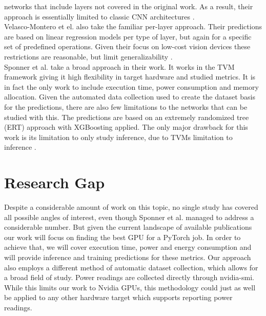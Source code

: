 networks that include layers not covered in the original work. As a result, their approach is essentially
limited to classic CNN architectures \cite{gianniti_performance_nodate}. \\
Velasco-Montero et el. also take the familiar per-layer approach. Their predictions are based on linear
regression models per type of layer, but again for a specific set of predefined operations. Given their 
focus on low-cost vision devices these restrictions are reasonable, but limit generalizability \cite{velasco-montero_previous_2020}. \\
Sponner et al. take a broad approach in their work. It works in the TVM framework giving it high flexibility
in target hardware and studied metrics. It is in fact the only work to include execution time, power
consumption and memory allocation. Given the automated data collection used to create the dataset basis
for the predictions, there are also few limitations to the networks that can be studied with this. 
The predictions are based on an extremely randomized tree (ERT) approach with XGBoosting applied. The 
only major drawback for this work is its limitation to only study inference, due to TVMs limitation to inference \cite{sponner_ai-driven_2022}. \\



\section{Research Gap}
Despite a considerable amount of work on this topic, no single study has covered all possible angles of interest, even though Sponner et al. managed to address a considerable number. But given the current landscape of available publications
our work will focus on finding the best GPU for a PyTorch job. In order to achieve that, we will cover
execution time, power and energy consumption and will provide inference and training predictions for these
metrics. Our approach also employs a different method of automatic dataset collection, which allows
for a broad field of study. Power readings are collected directly through nvidia-smi.
While this limits our work to Nvidia GPUs, this methodology could just as well be applied to any other hardware target which supports reporting power readings.
